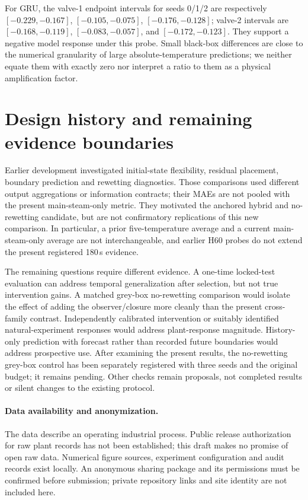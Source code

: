 For GRU, the valve-1 endpoint intervals for seeds 0/1/2 are respectively
$[-0.229,-0.167]$, $[-0.105,-0.075]$, $[-0.176,-0.128]$\degc{};
valve-2 intervals are $[-0.168,-0.119]$, $[-0.083,-0.057]$, and
$[-0.172,-0.123]$\degc{}. They support a negative model response under this
probe. Small black-box differences are close to the numerical granularity of
large absolute-temperature predictions; we neither equate them with exactly
zero nor interpret a ratio to them as a physical amplification factor.

\section{Design history and remaining evidence boundaries}

Earlier development investigated initial-state flexibility, residual placement,
boundary prediction and rewetting diagnostics. Those comparisons used different
output aggregations or information contracts; their MAEs are not pooled with
the present main-steam-only metric. They motivated the anchored hybrid and
no-rewetting candidate, but are not confirmatory replications of this new
comparison. In particular, a prior five-temperature average and a current
main-steam-only average are not interchangeable, and earlier H60 probes do not
extend the present registered 180\,s evidence.

The remaining questions require different evidence. A one-time locked-test
evaluation can address temporal generalization after selection, but not true
intervention gains. A matched grey-box no-rewetting comparison would isolate
the effect of adding the observer/closure more cleanly than the present
cross-family contrast. Independently calibrated intervention or suitably
identified natural-experiment responses would address plant-response magnitude.
History-only prediction with forecast rather than recorded future boundaries
would address prospective use. After examining the present results, the
no-rewetting grey-box control has been separately registered with three seeds
and the original budget; it remains pending. Other checks remain proposals,
not completed results or silent changes to the existing protocol.

\paragraph{Data availability and anonymization.}
The data describe an operating industrial process. Public release authorization
for raw plant records has not been established; this draft makes no promise of
open raw data. Numerical figure sources, experiment configuration and audit
records exist locally. An anonymous sharing package and its permissions must
be confirmed before submission; private repository links and site identity are
not included here.

